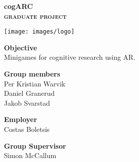 
\clearpage
\renewcommand{\headrulewidth}{0pt}
\thispagestyle{fancy}

\begin{center}
\Huge\bfseries cogARC\\
\large\bfseries\scshape graduate project
\end{center}

\vfill

\begin{center}
\texttt{[image: images/logo]}
\end{center}

\vfill

\begin{center}
\textbf{Objective}\\
Minigames for cognitive research using AR.
\end{center}

\vfill

\begin{minipage}[t]{0.5\linewidth}
\textbf{Group members}\\
Per Kristian Warvik\\
Daniel Granerud\\
Jakob Svarstad\\
\end{minipage}
\begin{minipage}[t]{0.5\linewidth}
\end{minipage}

\vfill

\begin{minipage}[t]{0.5\linewidth}
\textbf{Employer}\\
Costas Boletsis
\end{minipage}
\begin{minipage}[t]{0.5\linewidth}
\begin{flushright}
\textbf{Group Supervisor}\\
Simon McCallum
\end{flushright}
\end{minipage}

\vfill

